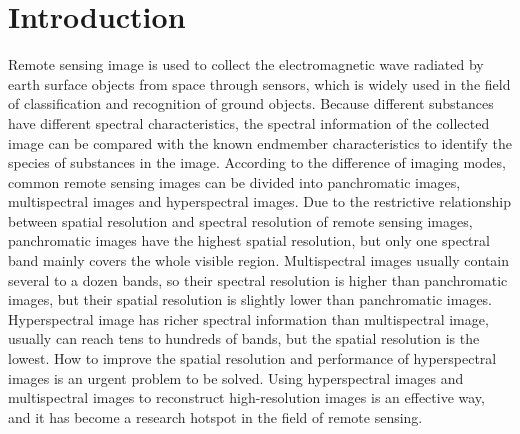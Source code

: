 \documentclass[journal]{IEEEtran}%
\begin{document}
\section{Introduction}%
\label{sec:Introduction}%
Remote sensing image is used to collect the electromagnetic wave radiated by earth surface objects from space through sensors, which is widely used in the field of classification and recognition of ground objects. Because different substances have different spectral characteristics, the spectral information of the collected image can be compared with the known endmember characteristics to identify the species of substances in the image. According to the difference of imaging modes, common remote sensing images can be divided into panchromatic images, multispectral images and hyperspectral images. Due to the restrictive relationship between spatial resolution and spectral resolution of remote sensing images, panchromatic images have the highest spatial resolution, but only one spectral band mainly covers the whole visible region. Multispectral images usually contain several to a dozen bands, so their spectral resolution is higher than panchromatic images, but their spatial resolution is slightly lower than panchromatic images. Hyperspectral image has richer spectral information than multispectral image, usually can reach tens to hundreds of bands, but the spatial resolution is the lowest. How to improve the spatial resolution and performance of hyperspectral images is an urgent problem to be solved. Using hyperspectral images and multispectral images to reconstruct high{-}resolution images is an effective way, and it has become a research hotspot in the field of remote sensing.%
\par%
\end{document}
